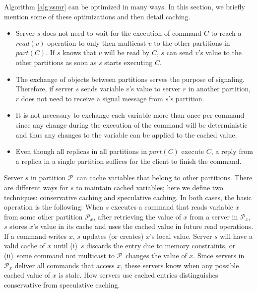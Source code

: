 \documentclass[10pt, conference, compsocconf, letterpaper]{IEEEtranv17}
\newcommand{\pp}{$\mathcal{P}$}
\newcommand{\ppm}{\mathcal{P}}
\begin{document}
Algorithm \ref{alg:ssmr} can be optimized in many ways. 
In this section, we briefly mention some of these optimizations and then detail caching.
\begin{itemize}
\item Server $s$ does not need to wait for the execution of command $C$ to reach a $read(v)$ operation to only then multicast $v$ to the other partitions in $part(C)$. If $s$ knows that $v$ will be read by $C$, $s$ can send $v$'s value to the other partitions as soon as $s$ starts executing $C$.
\item The exchange of objects between partitions serves the purpose of signaling. Therefore, if server $s$ sends variable $v$'s value to server $r$ in another partition, $r$ does not need to receive a signal message from $s$'s partition.
\item It is not necessary to exchange each variable more than once per command since any change during the execution of the command will be deterministic and thus any changes to the variable can be applied to the cached value.
\item Even though all replicas in all partitions in $part(C)$ execute $C$, a reply from a replica in a single partition suffices for the client to finish the command.
\end{itemize}

Server $s$ in partition \pp\ can cache variables that belong to other partitions. 
There are different ways for $s$ to maintain cached variables; here we define two techniques: conservative caching and speculative caching. 
In both cases, the basic operation is the following: 
When $s$ executes a command that reads variable $x$ from some other partition $\ppm{}_x$, after retrieving the value of $x$ from a server in $\ppm{}_x$, $s$ stores $x$'s value in its cache and uses the cached value in future read operations.
If a command writes $x$, $s$ updates (or creates) $x$'s local value. 
Server $s$ will have a valid cache of $x$ until (i)~$s$ discards the entry due to memory constraints, or (ii)~some command not multicast to \pp\ changes the value of $x$. 
Since servers in $\ppm_x$ deliver all commands that access $x$, these servers know when any possible cached value of $x$ is stale.
How servers use cached entries distinguishes conservative from speculative caching.
\end{document}
